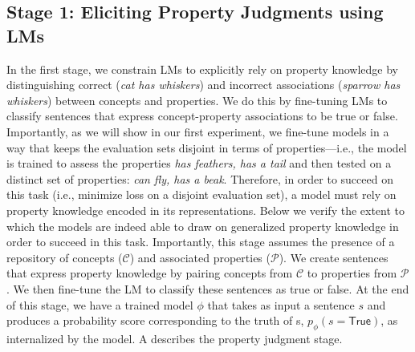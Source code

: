 \documentclass[10pt,letterpaper]{article}
\newcommand{\km}[1]{\textcolor{purple}{$_{KM}$[#1]}}
\newcommand{\concepts}{\mathcal{C}}
\newcommand{\properties}{\mathcal{P}}
\begin{document}
\subsection{Stage 1: Eliciting Property Judgments using LMs}
In the first stage, we constrain LMs to explicitly rely on property knowledge by distinguishing correct (\textit{cat has whiskers}) and incorrect associations (\textit{sparrow has whiskers}) between concepts and properties. 
We do this by fine-tuning LMs to classify sentences that express concept-property associations to be true or false. Importantly, as we will show in our first experiment, we fine-tune models in a way that keeps the evaluation sets disjoint in terms of properties---i.e., the model is trained to assess the properties \textit{has feathers, has a tail} and then tested on a distinct set of properties: \textit{can fly, has a beak}.
Therefore, in order to succeed on this task (i.e., minimize loss on a disjoint evaluation set), a model must rely on property knowledge encoded in its representations.
Below we verify the extent to which the models are indeed able to draw on generalized property knowledge in order to succeed in this task. 
Importantly, this stage assumes the presence of a repository of concepts ($\concepts$) and associated properties ($\properties$). 
We create sentences that express property knowledge by pairing concepts from $\concepts$ to properties from $\properties$. We then fine-tune the LM to classify these sentences as true or false. At the end of this stage, we have a trained model $\phi$ that takes as input a sentence $s$ and produces a probability score corresponding to the truth of s, $p_{\phi}(s = \mathsf{True})$, as internalized by the model.
A describes the property judgment stage.
\end{document}
